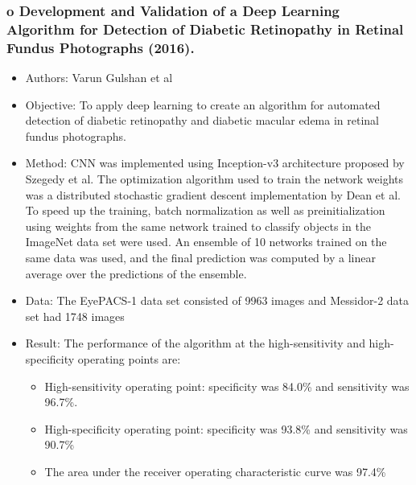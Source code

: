 \documentclass[12pt]{report}
\begin{document}
\subsubsection{o   Development and Validation of a Deep Learning Algorithm for Detection of Diabetic Retinopathy in Retinal Fundus Photographs (2016). \cite{gulshan2016development}}
\begin{itemize}
\item Authors: Varun Gulshan et al
\item Objective: To apply deep learning to create an algorithm for automated detection of diabetic retinopathy and diabetic macular edema in retinal fundus photographs.
\item Method: CNN was implemented using Inception-v3 architecture proposed by Szegedy et al. The optimization algorithm used to train the network weights was a distributed stochastic gradient descent implementation by Dean et al. To speed up the training, batch normalization as well as preinitialization using weights from the same network trained to classify objects in the ImageNet data set were used. An ensemble of 10 networks trained on the same data was used, and the final prediction was computed by a linear average over the predictions of the ensemble.
\item Data: The EyePACS-1 data set consisted of 9963 images and Messidor-2 data set had 1748 images
\item Result: The performance of the algorithm at the high-sensitivity and high-specificity operating points are:
\begin{itemize}
\item High-sensitivity operating point: specificity was 84.0\% and sensitivity was 96.7\%.
\item High-specificity operating point: specificity was 93.8\% and sensitivity was 90.7\%
\item The area under the receiver operating characteristic curve was 97.4\%
\end{itemize}
\end{itemize}
\end{document}
